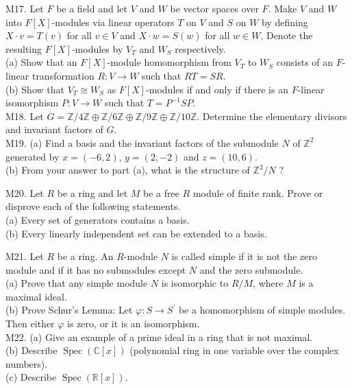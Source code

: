 M17. Let $F$ be a field and let $V$ and $W$ be vector spaces over $F$. Make $V$ and $W$ into $F[X]$-modules via linear operators $T$ on $V$ and $S$ on $W$ by defining $X \cdot v=T(v)$ for all $v \in V$ and $X \cdot w=S(w)$ for all $w \in W$. Denote the resulting $F[X]$-modules by $V_{T}$ and $W_{S}$ respectively.\\
(a) Show that an $F[X]$-module homomorphism from $V_{T}$ to $W_{S}$ consists of an $F$-linear transformation $R: V \rightarrow W$ such that $R T=S R$.\\
(b) Show that $V_{T} \cong W_{S}$ as $F[X]$-modules if and only if there is an $F$-linear isomorphism $P: V \rightarrow W$ such that $T=P^{-1} S P$.\\
M18. Let $G=\mathbb{Z} / 4 \mathbb{Z} \oplus \mathbb{Z} / 6 \mathbb{Z} \oplus \mathbb{Z} / 9 \mathbb{Z} \oplus \mathbb{Z} / 10 \mathbb{Z}$. Determine the elementary divisors and invariant factors of $G$.\\
M19. (a) Find a basis and the invariant factors of the submodule $N$ of $\mathbb{Z}^{2}$ generated by $x=(-6,2)$, $y=(2,-2)$ and $z=(10,6)$.\\
(b) From your answer to part (a), what is the structure of $\mathbb{Z}^{2} / N$ ?

M20. Let $R$ be a ring and let $M$ be a free $R$ module of finite rank. Prove or disprove each of the following statements.\\
(a) Every set of generators contains a basis.\\
(b) Every linearly independent set can be extended to a basis.

M21. Let $R$ be a ring. An $R$-module $N$ is called simple if it is not the zero module and if it has no submodules except $N$ and the zero submodule.\\
(a) Prove that any simple module $N$ is isomorphic to $R / M$, where $M$ is a maximal ideal.\\
(b) Prove Schur's Lemma: Let $\varphi: S \rightarrow S^{\prime}$ be a homomorphism of simple modules. Then either $\varphi$ is zero, or it is an isomorphism.\\
M22. (a) Give an example of a prime ideal in a ring that is not maximal.\\
(b) Describe $\operatorname{Spec}(\mathbb{C}[x])$ (polynomial ring in one variable over the complex numbers).\\
(c) Describe $\operatorname{Spec}(\mathbb{R}[x])$.